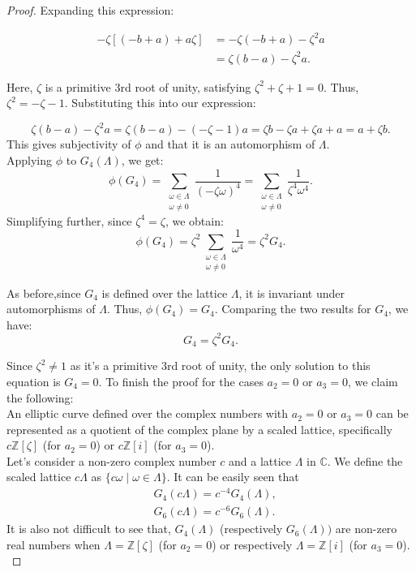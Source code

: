 \begin{proposition}
\begin{proof}
Expanding this expression:

\[
\begin{aligned}
-\zeta \left[ (-b+a) + a\zeta \right] &= -\zeta(-b+a) - \zeta^2 a \\
&= \zeta(b-a) - \zeta^2 a.
\end{aligned}
\]

Here, \( \zeta \) is a primitive 3rd root of unity, satisfying \( \zeta^2 + \zeta + 1 = 0 \). Thus, \( \zeta^2 = -\zeta - 1 \). Substituting this into our expression:

\[
\zeta(b-a) - \zeta^2 a = \zeta(b-a) - (-\zeta - 1) a = \zeta b - \zeta a + \zeta a + a = a + \zeta b.
\] This gives subjectivity of $\phi$ and that it is an automorphism of $\Lambda$. \\

Applying \( \phi \) to \( G_4(\Lambda) \), we get:
   \[
   \phi(G_4) = \sum_{\substack{\omega \in \Lambda \\ \omega \neq 0}} \frac{1}{(-\zeta \omega)^4} = \sum_{\substack{\omega \in \Lambda \\ \omega \neq 0}} \frac{1}{\zeta^4 \omega^4}.
   \]
   Simplifying further, since \( \zeta^4 = \zeta \), we obtain:
   \[
   \phi(G_4) = \zeta^2 \sum_{\substack{\omega \in \Lambda \\ \omega \neq 0}} \frac{1}{\omega^4} = \zeta^2 G_4.
   \]

As before,since \( G_4 \) is defined over the lattice \( \Lambda \), it is invariant under automorphisms of \( \Lambda \). Thus, \( \phi(G_4) = G_4 \).
   Comparing the two results for \( G_4 \), we have:
   \[
   G_4 = \zeta^2 G_4.
   \]

   Since \( \zeta^2 \neq 1 \) as it's a primitive 3rd root of unity, the only solution to this equation is \( G_4 = 0 \).
To finish the proof for the cases $a_2=0$ or $a_3=0$, we claim the following: \\

An elliptic curve defined over the complex numbers with \( a_2 = 0 \) or \( a_3 = 0 \) can be represented as a quotient of the complex plane by a scaled lattice, specifically \( c \mathbb{Z}[\zeta] \) (for \( a_2 = 0 \)) or \( c \mathbb{Z}[i] \) (for \( a_3 = 0 \)).\\

Let's consider a non-zero complex number \( c \) and a lattice \( \Lambda \) in \( \mathbb{C} \). We define the scaled lattice \( c\Lambda \) as \( \{c\omega \mid \omega \in \Lambda\} \). It can be easily seen that
\[
\begin{aligned}
& G_{4}(c\Lambda) = c^{-4} G_{4}(\Lambda), \\
& G_{6}(c\Lambda) = c^{-6} G_{6}(\Lambda).
\end{aligned}
\]
It is also not difficult to see that, $G_4(\Lambda)$ (respectively $G_6(\Lambda))$ are non-zero real numbers when \( \Lambda=\mathbb{Z}[\zeta] \) (for \( a_2 = 0 \)) or respectively \( \Lambda=  \mathbb{Z}[i] \) (for \( a_3 = 0 \)).\\


\end{proof}
\end{proposition}
